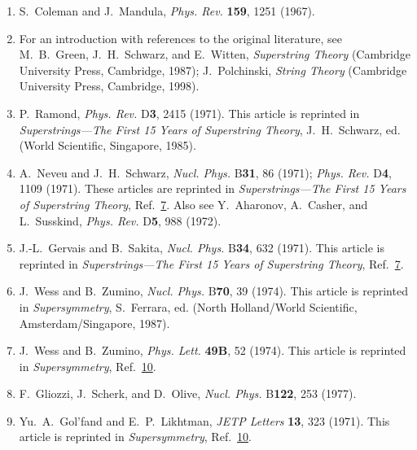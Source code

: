 \begin{enumerate}
  \item {}\label{ch24-ref-5}
  S.~Coleman and J.~Mandula, \textit{Phys. Rev.} \textbf{159}, 1251
  (1967).

  \item {}\label{ch24-ref-6}
  For an introduction with references to the original literature, see
  M.~B.~Green, J.~H.~Schwarz, and E.~Witten,
  \textit{Superstring Theory} (Cambridge University Press, Cambridge,
  1987); J.~Polchinski, \textit{String Theory} (Cambridge University
  Press, Cambridge, 1998).

  \item {}\label{ch24-ref-7}
  P.~Ramond, \textit{Phys. Rev.} D\textbf{3}, 2415 (1971). This article
  is reprinted in \textit{Superstrings---The First 15 Years of
  Superstring Theory}, J.~H.~Schwarz, ed. (World Scientific, Singapore,
  1985).

  \item {}\label{ch24-ref-8}
  A.~Neveu and J.~H.~Schwarz, \textit{Nucl. Phys.} B\textbf{31}, 86
  (1971); \textit{Phys. Rev.} D\textbf{4}, 1109 (1971). These articles
  are reprinted in \textit{Superstrings---The First 15 Years of
  Superstring Theory}, Ref.~\hyperref[ch24-ref-7]{7}. Also see
  Y.~Aharonov, A.~Casher, and L.~Susskind, \textit{Phys. Rev.}
  D\textbf{5}, 988 (1972).

  \item {}\label{ch24-ref-9}
  J.-L.~Gervais and B.~Sakita, \textit{Nucl. Phys.} B\textbf{34}, 632
  (1971). This article is reprinted in
  \textit{Superstrings---The First 15 Years of Superstring Theory},
  Ref.~\hyperref[ch24-ref-7]{7}.

  \item {}\label{ch24-ref-10}
  J.~Wess and B.~Zumino, \textit{Nucl. Phys.} B\textbf{70}, 39 (1974).
  This article is reprinted in \textit{Supersymmetry}, S.~Ferrara, ed.
  (North Holland/World Scientific, Amsterdam/Singapore, 1987).

  \item {}\label{ch24-ref-11}
  J.~Wess and B.~Zumino, \textit{Phys. Lett.} \textbf{49B}, 52 (1974).
  This article is reprinted in \textit{Supersymmetry},
  Ref.~\hyperref[ch24-ref-10]{10}.

  \item[11a.] \label{ch24-ref-11a}
  F.~Gliozzi, J.~Scherk, and D.~Olive, \textit{Nucl. Phys.}
  B\textbf{122}, 253 (1977).

  \item {}\label{ch24-ref-12}
  Yu.~A.~Gol'fand and E.~P.~Likhtman, \textit{JETP Letters} \textbf{13},
  323 (1971). This article is reprinted in \textit{Supersymmetry},
  Ref.~\hyperref[ch24-ref-10]{10}.


\end{enumerate}
